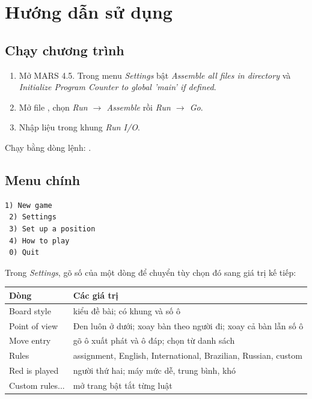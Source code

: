\chapter{Hướng dẫn sử dụng}

\section{Chạy chương trình}

\begin{enumerate}
\item Mở MARS 4.5. Trong menu \emph{Settings} bật \emph{Assemble all files in directory} và \emph{Initialize Program Counter to global 'main' if defined}.
\item Mở file , chọn \emph{Run $\to$ Assemble} rồi \emph{Run $\to$ Go}.
\item Nhập liệu trong khung \emph{Run I/O}.
\end{enumerate}

Chạy bằng dòng lệnh: .

\section{Menu chính}

\begin{lstlisting}[style=screen]
 1) New game
 2) Settings
 3) Set up a position
 4) How to play
 0) Quit
\end{lstlisting}

Trong \emph{Settings}, gõ số của một dòng để chuyển tùy chọn đó sang giá trị kế tiếp:

\begin{table}[ht]
\centering\small
\begin{tabularx}{\textwidth}{@{}lL@{}}
\toprule
Dòng & Các giá trị \\
\midrule
Board style & kiểu đề bài; có khung và số ô \\
Point of view & Đen luôn ở dưới; xoay bàn theo người đi; xoay cả bàn lẫn số ô \\
Move entry & gõ ô xuất phát và ô đáp; chọn từ danh sách \\
Rules & assignment, English, International, Brazilian, Russian, custom \\
Red is played & người thứ hai; máy mức dễ, trung bình, khó \\
Custom rules... & mở trang bật tắt từng luật \\
\bottomrule
\end{tabularx}
\end{table}

